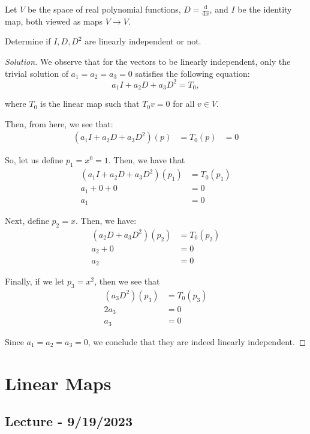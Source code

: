 \documentclass[openany]{book}
\newenvironment{solution}{\begin{proof}[Solution]}{\end{proof}}
\begin{document}
\begin{hw}
	Let $V$ be the space of real polynomial functions, $D = \frac{\mathrm d}{\mathrm dx}$, and $I$ be the identity map, both viewed as maps $V \rightarrow V$.
	
	Determine if $I, D, D^{2}$ are linearly independent or not.
\end{hw}
\begin{solution}
	We observe that for the vectors to be linearly independent, only the trivial solution of $a_{1} = a_{2} = a_{3} = 0$ satisfies the following equation:
	\begin{equation*}
		a_{1}I + a_{2}D + a_{3}D^{2} = T_{0},
	\end{equation*}

	where $T_{0}$ is the linear map such that $T_{0}v = 0$ for all $v \in V$.
	
	Then, from here, we see that:
	\begin{align*}
		(a_{1}I + a_{2}D + a_{3}D^{2})(p) &= T_{0}(p)
		&= 0
	\end{align*}

	So, let us define $p_{1} = x^{0} = 1$. Then, we have that
	\begin{align*}
		(a_{1}I + a_{2}D + a_{3}D^{2})(p_{1}) &= T_{0}(p_{1}) \\
		a_{1} + 0 + 0 &= 0 \\
		a_{1} &= 0
	\end{align*}

	Next, define $p_{2} = x$. Then, we have:
	\begin{align*}
		(a_{2}D + a_{3}D^{2})(p_{2}) &= T_{0}(p_{2}) \\
		a_{2} + 0 &= 0 \\
		a_{2} &= 0
	\end{align*}

	Finally, if we let $p_{3} = x^{2}$, then we see that
	\begin{align*}
		(a_{3}D^{2})(p_{3}) &= T_{0}(p_{3}) \\
		2a_{3} &= 0 \\
		a_{3} &= 0
	\end{align*}

	Since $a_{1} = a_{2} = a_{3} = 0$, we conclude that they are indeed linearly independent.
\end{solution}

\chapter{Linear Maps}
\section{Lecture - 9/19/2023}
\end{document}
